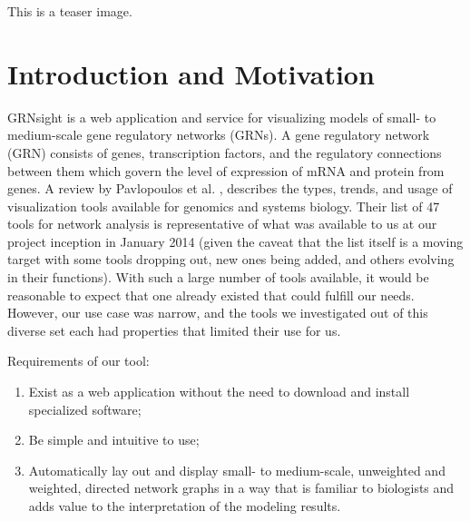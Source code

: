 \documentclass[sigconf,review,anonymous]{acmart}
\begin{document}



\begin{teaserfigure}
  \caption{This is a teaser image.}
  \label{fig:teaser}
\end{teaserfigure}


\maketitle

\section{Introduction and Motivation}

GRNsight is a web application and service for visualizing models of small- to medium-scale gene regulatory networks (GRNs). A gene regulatory network (GRN) consists of genes, transcription factors, and the regulatory connections between them which govern the level of expression of mRNA and protein from genes. A review by Pavlopoulos et al. \cite{doi:10.1186/s13742-015-0077-2}, describes the types, trends, and usage of visualization tools available for genomics and systems biology. Their list of 47 tools for network analysis is representative of what was available to us at our project inception in January 2014 (given the caveat that the list itself is a moving target with some tools dropping out, new ones being added, and others evolving in their functions). With such a large number of tools available, it would be reasonable to expect that one already existed that could fulfill our needs. However, our use case was narrow, and the tools we investigated out of this diverse set each had properties that limited their use for us.

Requirements of our tool:
\begin{enumerate}
\item Exist as a web application without the need to download and install specialized software;
\item Be simple and intuitive to use;
\item Automatically lay out and display small- to medium-scale, unweighted and weighted, directed network graphs in a way that is familiar to biologists and adds value to the interpretation of the modeling results.
\end{enumerate}
\end{document}
